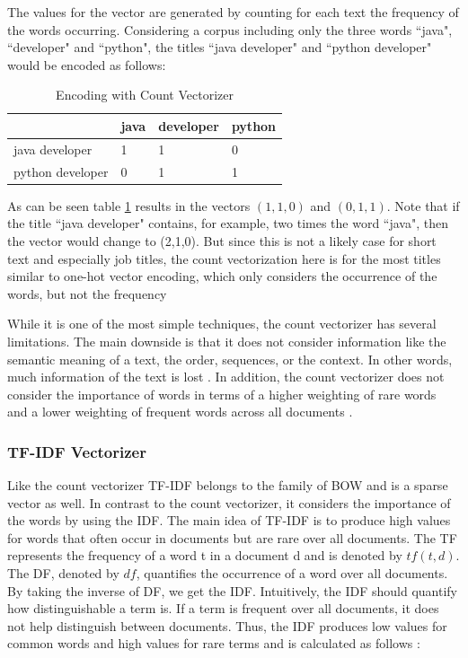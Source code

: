 \documentclass[12pt, a4paper, titlepage]{article}
\begin{document}
The values for the vector are generated by counting for each text the frequency of the words occurring. Considering a corpus including only the three words ``java", ``developer" and ``python", the titles ``java developer" and ``python developer" would be encoded as follows:


\begin{table}[hb!]
\center
  \begin{tabular}{llll}
  \hline
                   & java & developer & python \\ \hline
  java developer   & 1    & 1         & 0      \\
  python developer & 0    & 1         & 1      \\ \hline
  \end{tabular}
  \caption{\label{tab: T11} Encoding with Count Vectorizer}
  \end{table}


As can be seen table \ref{tab: T11} results in the vectors $(1,1,0)$ and $(0,1,1)$. Note that if the title ``java developer" contains, for example, two times the word ``java", then the vector would change to (2,1,0). But since this is not a likely case for short text and especially job titles, the count vectorization here is for the most titles similar to one-hot vector encoding, which only considers the occurrence of the words, but not the frequency \citep{kulkarni2021, sarkar2016}

  While it is one of the most simple techniques, the count vectorizer has several limitations. The main downside is that it does not consider information like the semantic meaning of a text, the order, sequences, or the context. In other words, much information of the text is lost \citep{sarkar2016}. In addition, the count vectorizer does not consider the importance of words in terms of a higher weighting of rare words and a lower weighting of frequent words across all documents \citep{suleymanov2019}.

\subsubsection*{TF-IDF Vectorizer}
Like the count vectorizer \ac{TF-IDF} belongs to the family of \ac{BOW} and is a sparse vector as well. In contrast to the count vectorizer, it considers the importance of the words by using the \ac{IDF}. The main idea of \ac{TF-IDF} is to produce high values for words that often occur in documents but are rare over all documents. The \ac{TF} represents the frequency of a word t in a document d and is denoted by $tf(t,d)$. The \ac{DF}, denoted by $df$, quantifies the occurrence of a word over all documents. By taking the inverse of \ac{DF}, we get the \ac{IDF}. Intuitively, the \ac{IDF} should quantify how distinguishable a term is. If a term is frequent over all documents, it does not help distinguish between documents. Thus, the \ac{IDF} produces low values for common words and high values for rare terms and is calculated as follows \citep{sidorov2019, kuang2010}: 
\end{document}

